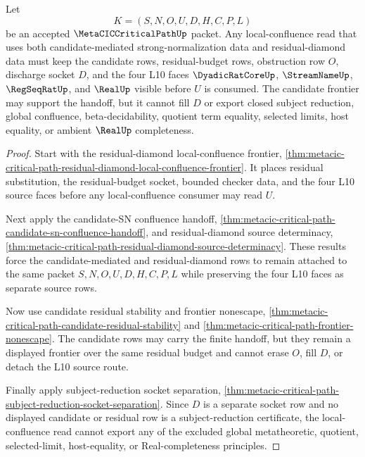 \begin{theorem}
\label{thm:metacic-critical-path-candidate-residual-diamond-lock}
Let
$$
K=(S,N,O,U,D,H,C,P,L)
$$
be an accepted $\MetaCICCriticalPathUp$ packet. Any local-confluence read that uses both candidate-mediated strong-normalization data and residual-diamond data must keep the candidate rows, residual-budget rows, obstruction row $O$, discharge socket $D$, and the four L10 faces $\DyadicRatCoreUp$, $\StreamNameUp$, $\RegSeqRatUp$, and $\RealUp$ visible before $U$ is consumed. The candidate frontier may support the handoff, but it cannot fill $D$ or export closed subject reduction, global confluence, beta-decidability, quotient term equality, selected limits, host equality, or ambient $\RealUp$ completeness.
\end{theorem}
\begin{proof}
Start with the residual-diamond local-confluence frontier, \autoref{thm:metacic-critical-path-residual-diamond-local-confluence-frontier}. It places residual substitution, the residual-budget socket, bounded checker data, and the four L10 source faces before any local-confluence consumer may read $U$.

Next apply the candidate-SN confluence handoff, \autoref{thm:metacic-critical-path-candidate-sn-confluence-handoff}, and residual-diamond source determinacy, \autoref{thm:metacic-critical-path-residual-diamond-source-determinacy}. These results force the candidate-mediated and residual-diamond rows to remain attached to the same packet $S,N,O,U,D,H,C,P,L$ while preserving the four L10 faces as separate source rows.

Now use candidate residual stability and frontier nonescape, \autoref{thm:metacic-critical-path-candidate-residual-stability} and \autoref{thm:metacic-critical-path-frontier-nonescape}. The candidate rows may carry the finite handoff, but they remain a displayed frontier over the same residual budget and cannot erase $O$, fill $D$, or detach the L10 source route.

Finally apply subject-reduction socket separation, \autoref{thm:metacic-critical-path-subject-reduction-socket-separation}. Since $D$ is a separate socket row and no displayed candidate or residual row is a subject-reduction certificate, the local-confluence read cannot export any of the excluded global metatheoretic, quotient, selected-limit, host-equality, or Real-completeness principles.
\end{proof}
